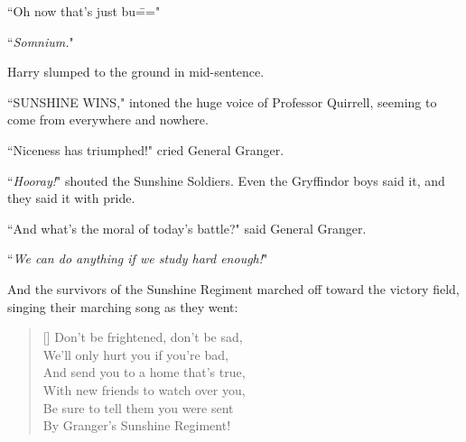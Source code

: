 ``Oh now that's just bu\==="

``\emph{Somnium.}"

Harry slumped to the ground in mid-sentence.

``SUNSHINE WINS," intoned the huge voice of Professor Quirrell, seeming to come from everywhere and nowhere.

``Niceness has triumphed!" cried General Granger.

``\emph{Hooray!}" shouted the Sunshine Soldiers. Even the Gryffindor boys said it, and they said it with pride.

``And what's the moral of today's battle?" said General Granger.

``\emph{We can do anything if we study hard enough!}"

And the survivors of the Sunshine Regiment marched off toward the victory field, singing their marching song as they went:

\baselineskip\settowidth{\versewidth}{With new friends to watch over you,}
\begin{verse}[\versewidth]
Don't be frightened, don't be sad,\\
We'll only hurt you if you're bad,\\
And send you to a home that's true,\\
With new friends to watch over you,\\
Be sure to tell them you were sent\\
By Granger's Sunshine Regiment!
\end{verse}

